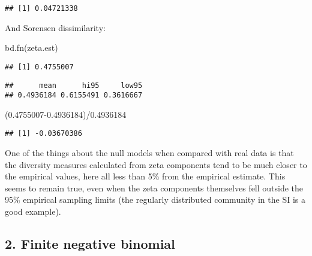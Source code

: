 \documentclass[
]{article}
\newenvironment{Shaded}{\begin{snugshade}}{\end{snugshade}}
\newcommand{\FloatTok}[1]{\textcolor[rgb]{0.00,0.00,0.81}{#1}}
\newcommand{\FunctionTok}[1]{\textcolor[rgb]{0.00,0.00,0.00}{#1}}
\newcommand{\NormalTok}[1]{#1}
\newcommand{\SpecialCharTok}[1]{\textcolor[rgb]{0.00,0.00,0.00}{#1}}
\begin{document}
\begin{verbatim}
## [1] 0.04721338
\end{verbatim}

And Sorensen dissimilarity:

\begin{Shaded}
\begin{Highlighting}[]
\FunctionTok{bd.fn}\NormalTok{(zeta.est)}
\end{Highlighting}
\end{Shaded}

\begin{verbatim}
## [1] 0.4755007
\end{verbatim}

\begin{Shaded}
\end{Shaded}

\begin{verbatim}
##      mean      hi95     low95 
## 0.4936184 0.6155491 0.3616667
\end{verbatim}

\begin{Shaded}
\begin{Highlighting}[]
\NormalTok{(}\FloatTok{0.4755007{-}0.4936184}\NormalTok{)}\SpecialCharTok{/}\FloatTok{0.4936184} 
\end{Highlighting}
\end{Shaded}

\begin{verbatim}
## [1] -0.03670386
\end{verbatim}

One of the things about the null models when compared with real data is
that the diversity measures calculated from zeta components tend to be
much closer to the empirical values, here all less than 5\% from the
empirical estimate. This seems to remain true, even when the zeta
components themselves fell outside the 95\% empirical sampling limits
(the regularly distributed community in the SI is a good example).

\hypertarget{finite-negative-binomial}{%
\subsection{2. Finite negative
binomial}\label{finite-negative-binomial}}
\end{document}
